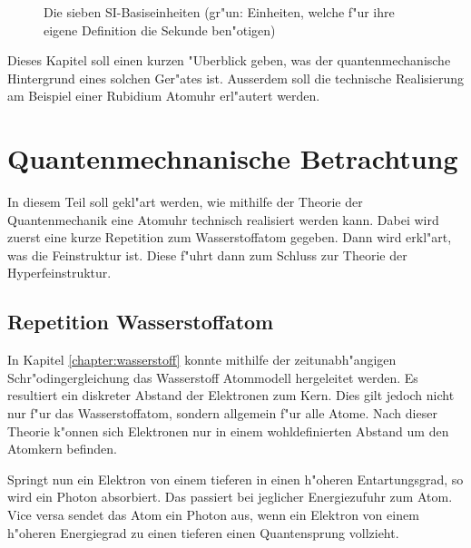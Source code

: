\begin{refsection}
\begin{figure}
  \caption{Die sieben SI-Basiseinheiten \cite{wiki:si} (gr"un: Einheiten, welche f"ur
    ihre eigene Definition die Sekunde ben"otigen)}
  \label{fig:siBasis}
\end{figure}

Dieses Kapitel soll einen kurzen "Uberblick geben, was der
quantenmechanische Hintergrund eines solchen Ger"ates ist. Ausserdem
soll die technische Realisierung am Beispiel einer Rubidium Atomuhr
erl"autert werden.


\section{Quantenmechnanische Betrachtung}

In diesem Teil soll gekl"art werden, wie mithilfe der Theorie der
Quantenmechanik eine Atomuhr technisch realisiert werden kann. Dabei
wird zuerst eine kurze Repetition zum Wasserstoffatom gegeben. Dann
wird erkl"art, was die Feinstruktur ist. Diese f"uhrt dann zum Schluss
zur Theorie der Hyperfeinstruktur.

\subsection{Repetition Wasserstoffatom}
In Kapitel \ref{chapter:wasserstoff} konnte mithilfe der
zeitunabh"angigen Schr"odingergleichung das Wasserstoff Atommodell
hergeleitet werden.  Es resultiert ein diskreter Abstand der
Elektronen zum Kern.  Dies gilt jedoch nicht nur f"ur das
Wasserstoffatom, sondern allgemein f"ur alle Atome.  Nach dieser
Theorie k"onnen sich Elektronen nur in einem wohldefinierten Abstand
um den Atomkern befinden.

Springt nun ein Elektron von einem tieferen in einen h"oheren
Entartungsgrad, so wird ein Photon absorbiert.  Das passiert bei
jeglicher Energiezufuhr zum Atom.  Vice versa sendet das Atom ein
Photon aus, wenn ein Elektron von einem h"oheren Energiegrad zu einen
tieferen einen Quantensprung vollzieht.


\end{refsection}
